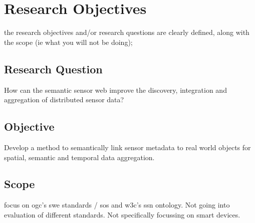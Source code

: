 
\chapter{Research Objectives}
\label{chap:objectives}

the research objectives and/or research questions are clearly defined, along with the scope (ie what you will not be doing);

\section{Research Question} 
How can the semantic sensor web improve the discovery, integration and aggregation of distributed sensor data?



\section{Objective} 
Develop a method to semantically link sensor metadata to real world objects for spatial, semantic and temporal data aggregation.


\section{Scope} 
focus on \ac{ogc}'s \ac{swe} standards / \ac{sos} and \ac{w3c}'s \ac{ssn} ontology. Not going into evaluation of different standards. Not specifically focussing on smart devices.